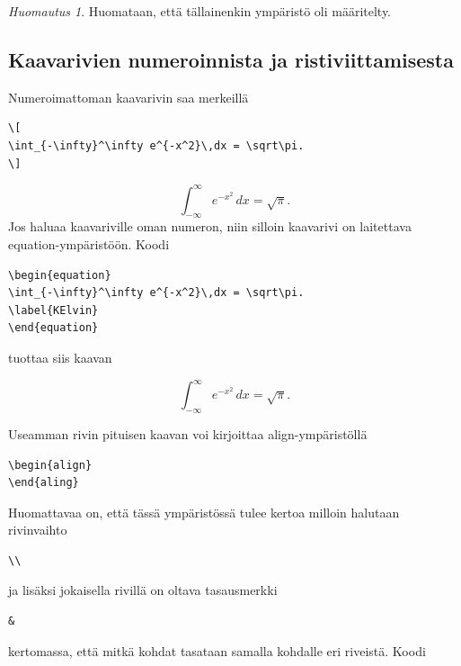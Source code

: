\documentclass[a4paper,12 pt]{article}
\theoremstyle{plain}
\theoremstyle{definition}
\theoremstyle{remark}
\newtheorem{huomautus}[lause]{Huomautus}
\numberwithin{equation}{section}
\numberwithin{figure}{section}
\begin{document}
\begin{huomautus}
Huomataan, että tällainenkin ympäristö oli määritelty.
\end{huomautus}

\subsection{Kaavarivien numeroinnista ja ristiviittamisesta}

Numeroimattoman kaavarivin saa merkeillä 
\begin{verbatim}
\[ 
\int_{-\infty}^\infty e^{-x^2}\,dx = \sqrt\pi. 
\]
\end{verbatim}
\[
\int_{-\infty}^\infty e^{-x^2}\,dx = \sqrt\pi.
\]
Jos haluaa kaavariville oman numeron, niin silloin kaavarivi on laitettava equation-ympäristöön. Koodi

\begin{verbatim}
\begin{equation}
\int_{-\infty}^\infty e^{-x^2}\,dx = \sqrt\pi.
\label{KElvin}
\end{equation}
\end{verbatim}
tuottaa siis kaavan

\begin{equation}
\int_{-\infty}^\infty e^{-x^2}\,dx = \sqrt\pi.
\label{KElvin}
\end{equation}


\noindent
Useamman rivin pituisen kaavan voi kirjoittaa align-ympäristöllä

\begin{verbatim}
\begin{align}
\end{aling}
\end{verbatim}
Huomattavaa on, että tässä ympäristössä tulee kertoa milloin halutaan rivinvaihto 

\begin{verbatim}
\\    
\end{verbatim}
ja lisäksi jokaisella rivillä on oltava tasausmerkki 

\begin{verbatim}
&    
\end{verbatim}
kertomassa, että mitkä kohdat tasataan samalla kohdalle eri riveistä. Koodi
\end{document}
